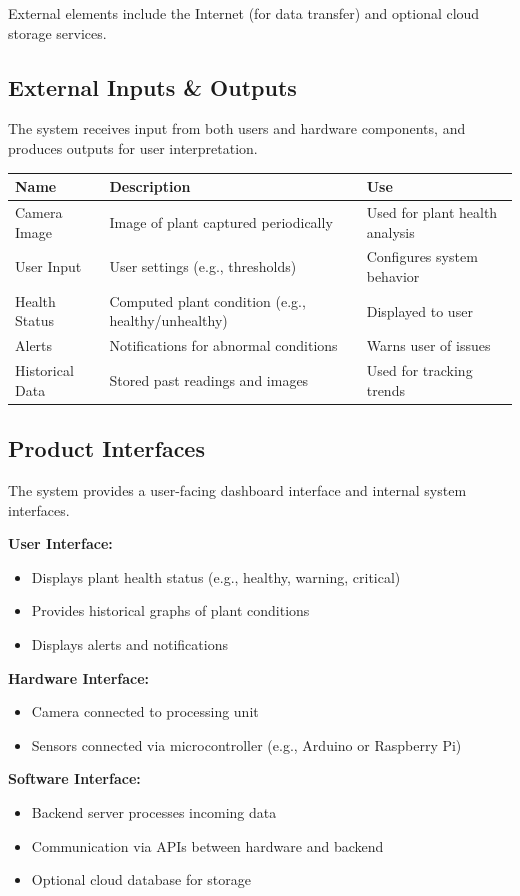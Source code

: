 External elements include the Internet (for data transfer) and optional cloud storage services.

\subsection{External Inputs \& Outputs}

The system receives input from both users and hardware components, and produces outputs for user interpretation.

\begin{center}
\begin{tabular}{|l|l|l|}
\hline
\textbf{Name} & \textbf{Description} & \textbf{Use} \\
\hline
Camera Image & Image of plant captured periodically & Used for plant health analysis \\
User Input & User settings (e.g., thresholds) & Configures system behavior \\
\hline
Health Status & Computed plant condition (e.g., healthy/unhealthy) & Displayed to user \\
Alerts & Notifications for abnormal conditions & Warns user of issues \\
Historical Data & Stored past readings and images & Used for tracking trends \\
\hline
\end{tabular}
\end{center}

\subsection{Product Interfaces}

The system provides a user-facing dashboard interface and internal system interfaces.

\textbf{User Interface:}
\begin{itemize}
    \item Displays plant health status (e.g., healthy, warning, critical)
    \item Provides historical graphs of plant conditions
    \item Displays alerts and notifications
\end{itemize}

\textbf{Hardware Interface:}
\begin{itemize}
    \item Camera connected to processing unit
    \item Sensors connected via microcontroller (e.g., Arduino or Raspberry Pi)
\end{itemize}

\textbf{Software Interface:}
\begin{itemize}
    \item Backend server processes incoming data
    \item Communication via APIs between hardware and backend
    \item Optional cloud database for storage
\end{itemize}